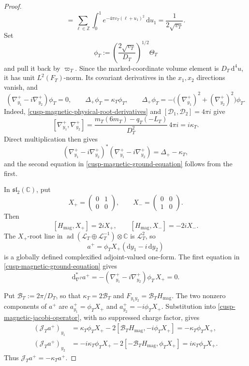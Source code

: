 \begin{proof}
\[ =\sum_{\ell\in\mathbb Z}\int_0^1
   e^{-4\pi v_T(\ell+u_1)^2}\,\mathrm du_1
 =\frac1{2\sqrt{v_T}}.
\]
Set
\[
 \phi_T:=\left(\frac{2\sqrt{v_T}}{D_T}\right)^{1/2}\Theta_T
\]
and pull it back by \(\varpi_T\).  Since the marked-coordinate volume
element is \(D_T\,\mathrm d^4u\), it has unit \(L^2(F_T)\)-norm.  Its
covariant derivatives in the \(x_1,x_2\) directions vanish, and
\begin{equation}
 (\nabla_{y_1}^+-i\nabla_{y_2}^+)\phi_T=0,
 \qquad
 \Delta_+\phi_T=\kappa_T\phi_T,
 \qquad
 \Delta_+\phi_T
 =-\bigl((\nabla_{y_1}^+)^2+(\nabla_{y_2}^+)^2\bigr)\phi_T.
 \label{cusp-magnetic-ground-equation}
\end{equation}
Indeed, \cref{cusp-magnetic-physical-root-derivatives} and
\([\mathcal D_1,\mathcal D_2]=4\pi i\) give
\[
 [\nabla_{y_1}^+,\nabla_{y_2}^+]
 =\frac{m_T(6m_T)-q_T(-L_T)}{D_T^2}\,4\pi i
 =i\kappa_T.
\]
Direct multiplication then gives
\[
 (\nabla_{y_1}^+-i\nabla_{y_2}^+)^*
 (\nabla_{y_1}^+-i\nabla_{y_2}^+)=\Delta_+-\kappa_T,
\]
and the second equation in \eqref{cusp-magnetic-ground-equation} follows
from the first.

In \(\mathfrak{sl}_2(\mathbb C)\), put
\[
 X_+=\begin{pmatrix}0&1\\0&0\end{pmatrix},
 \qquad
 X_-=\begin{pmatrix}0&0\\1&0\end{pmatrix}.
\]
Then
\[
 [H_{\mathrm{mag}},X_+]=2iX_+,
 \qquad
 [H_{\mathrm{mag}},X_-]=-2iX_-.
\]
The \(X_+\)-root line in
\(\operatorname{ad}(\mathscr L_T\oplus\mathscr L_T^{-1})
 \otimes\mathbb C\) is \(\mathscr L_T^2\),
so
\[
 a^+=\phi_TX_+(\mathrm dy_1-i\,\mathrm dy_2)
\]
is a globally defined complexified adjoint-valued one-form.  The first
equation in \eqref{cusp-magnetic-ground-equation} gives
\[
 \mathrm d_{\nabla^T}^*a^+
 =-(\nabla_{y_1}^+-i\nabla_{y_2}^+)\phi_T\,X_+=0.
\]

Put \(\mathcal B_T:=2\pi/D_T\), so that
\(\kappa_T=2\mathcal B_T\) and
\(F_{y_1y_2}=\mathcal B_TH_{\mathrm{mag}}\).  The two nonzero components
of \(a^+\) are \(a_{y_1}^+=\phi_TX_+\) and
\(a_{y_2}^+=-i\phi_TX_+\).  Substitution into
\eqref{cusp-magnetic-jacobi-operator}, with no suppressed charge factor,
gives
\begin{align*}
 (\mathcal J_Ta^+)_{y_1}
 &=\kappa_T\phi_TX_+
   -2[\mathcal B_TH_{\mathrm{mag}},-i\phi_TX_+]
  =-\kappa_T\phi_TX_+,\\
 (\mathcal J_Ta^+)_{y_2}
 &=-i\kappa_T\phi_TX_+
   -2[-\mathcal B_TH_{\mathrm{mag}},\phi_TX_+]
  =i\kappa_T\phi_TX_+.
\end{align*}
Thus \(\mathcal J_Ta^+=-\kappa_Ta^+\).


\end{proof}
